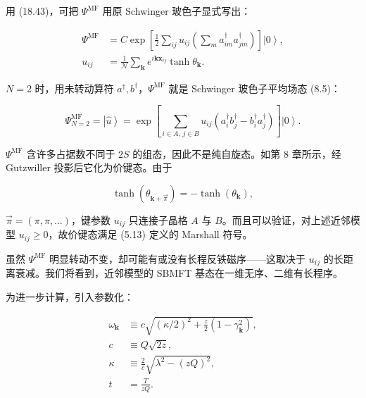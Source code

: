 用 (18.43)，可把 $\Psi^{\mathrm{MF}}$ 用原 Schwinger 玻色子显式写出：

\begin{align*}
\Psi^ {\mathrm{MF}} & = C \exp \left[ \frac {1}{2} \sum_ {ij} u _ {ij} \left( \sum_ {m} a _ {im} ^ {\dagger} a _ {jm} ^ {\dagger} \right) \right] \left| 0 \right\rangle ,\\
u _ {ij} & = \frac {1}{\mathcal {N}} \sum_ {\mathbf {k}} e ^ {i \mathbf {k} \mathbf {x} _ {ij}} \tanh \theta_ {\mathbf {k}}.
\tag{18.52}
\end{align*}

$N = 2$ 时，用未转动算符 $a^{\dagger}, b^{\dagger}$，$\Psi^{\mathrm{MF}}$ 就是 Schwinger 玻色子平均场态 (8.5)：

\begin{equation*}
\Psi_{N = 2} ^ {\mathrm{MF}} = \left| \hat {u} \right\rangle = \exp \left[ \sum_{i \in A, \, j \in B} u _ {ij} \left( a _ {i} ^ {\dagger} b _ {j} ^ {\dagger} - b _ {i} ^ {\dagger} a _ {j} ^ {\dagger} \right) \right] \left| 0 \right\rangle .
\tag{18.53}
\end{equation*}

$\Psi^{\mathrm{MF}}$ 含许多占据数不同于 $2S$ 的组态，因此不是纯自旋态。如第 8 章所示，经 Gutzwiller 投影后它化为价键态。由于

\begin{equation*}
\tanh \left( \theta_{\mathbf {k} + \vec {\pi}} \right) = - \tanh \left( \theta_{\mathbf {k}} \right) ,
\tag{18.54}
\end{equation*}

$\vec{\pi} = (\pi, \pi, \ldots)$，键参数 $u_{ij}$ 只连接子晶格 $A$ 与 $B$。而且可以验证，对上述近邻模型 $u_{ij} \geq 0$，故价键态满足 (5.13) 定义的 Marshall 符号。

虽然 $\Psi^{\mathrm{MF}}$ 明显转动不变，却可能有或没有长程反铁磁序——这取决于 $u_{ij}$ 的长距离衰减。我们将看到，近邻模型的 SBMFT 基态在一维无序、二维有长程序。

为进一步计算，引入参数化：

\begin{align*}
\omega_ {\mathbf {k}} & \equiv c \sqrt { ( \kappa / 2 ) ^ {2} + \frac {z}{2} \left( 1 - \gamma_{\mathbf {k}} ^ {2} \right) } ,\\
c & \equiv Q \sqrt {2 z} ,\\
\kappa & \equiv \frac {2}{c} \sqrt {\lambda^ {2} - \left( z Q \right) ^ {2}} ,\\
t & = \frac {T}{z Q}.
\tag{18.55}
\end{align*}

